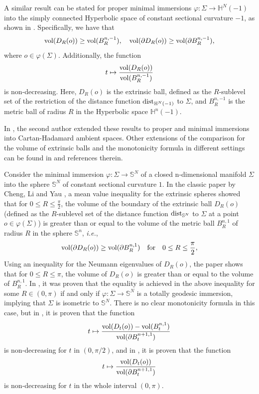 \documentclass{amsart}
\theoremstyle{definition}
\theoremstyle{remark}
\begin{document}
A similar result can be stated for proper minimal immersions $\varphi:\Sigma\to \mathbb{H}^N(-1)$ into the simply connected Hyperbolic space of constant sectional curvature $-1$, as shown in \cite{Anderson1982477}. Specifically, we have that
$$
{\rm vol}(D_R(o))\geq {\rm vol}(B_R^{n,-1}),\quad  {\rm vol}(\partial D_R(o))\geq {\rm vol}(\partial B_R^{n,-1}),
$$
where $o\in \varphi(\Sigma)$. Additionally, the function
$$
t\mapsto \frac{{\rm vol}(D_R(o))}{{\rm vol}(B_R^{n,-1})}
$$
is non-decreasing. Here, $D_R(o)$ is the extrinsic ball, defined as the $R$-sublevel set of the restriction of the distance function ${\rm dist}_{\mathbb{H}^N(-1)}$ to $\Sigma$, and $B_R^{n,-1}$ is the metric ball of radius $R$ in the Hyperbolic space $\mathbb{H}^{n}(-1)$.

In \cite{Palmer1999607}, the second author extended these results to proper and minimal immersions into Cartan-Hadamard ambient spaces. Other extensions of the comparison for the volume of extrinsic balls and the monotonicity formula in different settings can be found in \cite{Lima20161035} and references therein.

Consider the minimal immersion $\varphi: \Sigma\to \mathbb{S}^N$ of a closed n-dimensional manifold $\Sigma$ into the sphere $\mathbb{S}^N$ of constant sectional curvature $1$. In the classic paper by Cheng, Li and Yau \cite{CLY1984}, a mean value inequality for the extrinsic spheres showed that for $0\leq R\leq \frac{\pi}{2}$, the volume of the boundary of the extrinsic ball $D_R(o)$ (defined as the $R$-sublevel set of the distance function ${\rm dist}_{\mathbb{S}^N}$ to $\Sigma$ at a point $o\in \varphi(\Sigma)$) is greater than or equal to the volume of the metric ball $B_R^{n,1}$ of radius $R$ in the sphere $\mathbb{S}^n$, \emph{i.e.},
$$
{\rm vol}(\partial D_R(o))\geq {\rm vol}(\partial B_R^{n,1})\quad {\rm for}\quad 0\leq R\leq \frac{\pi}{2},
$$
Using an inequality for the Neumann eigenvalues of $D_R(o)$, the paper shows that for $0\leq R\leq \pi$, the volume of $D_R(o)$ is greater than or equal to the volume of $B_R^{n,1}$.
In \cite{Markvorsen2002101}, it was proven that the equality is achieved in the above inequality for some $R\in(0,\pi)$ if and only if $\varphi:\Sigma\to \mathbb{S}^N$ is a totally geodesic immersion, implying that $\Sigma$ is isometric to $\mathbb{S}^N$. There is no clear monotonicity formula in this case, but in \cite{Palmer1999607, Markvorsen2002101}, it is proven that the function
$$
t\mapsto \frac{{\rm vol}(D_t(o))-{\rm vol}( B_t^{n,1})}{{\rm vol}(\partial  B_t^{n+1,1})}
$$
is non-decreasing for $t$ in $(0,\pi/2)$, and in \cite{Kokarev2021}, it is proven that the function
$$
t\mapsto \frac{{\rm vol}(D_t(o))}{{\rm vol}(\partial  B_t^{n+1,1})}
$$
is non-decreasing for $t$ in the whole interval $(0,\pi)$.
\end{document}
